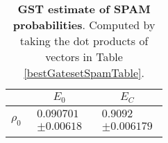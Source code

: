 \documentclass{article}[11pt]
\begin{document}
\begin{table}[h]
\begin{center}
\begin{tabular}[l]{|c|c|c|}
\hline
 & $E_{0}$ & $E_C$ \\ \hline
$\rho_{0}$ & $ \begin{array}{c} 0.090701 \\ \pm 0.00618 \end{array} $ & $ \begin{array}{c} 0.9092 \\ \pm 0.006179 \end{array} $ \\ \hline
\end{tabular}

\caption{\textbf{GST estimate of SPAM probabilities}.  Computed by taking the dot products of vectors in Table \ref{bestGatesetSpamTable}.\label{bestGatesetSpamParametersTable}}
\end{center}
\end{table}
\end{document}
